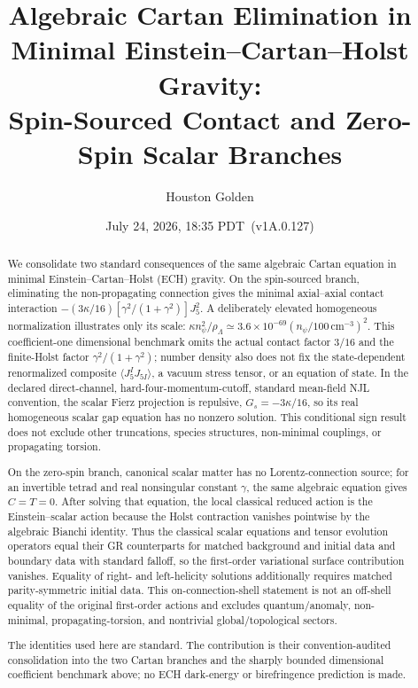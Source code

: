 \documentclass[aps,prd,twocolumn,superscriptaddress,preprintnumbers,nofootinbib,longbibliography,floatfix]{revtex4-2}
\newcommand{\paperVersion}{v1A.0.127}
\newcommand{\paperTimestamp}{July 24, 2026, 18:35 PDT}
\begin{document}

\title{Algebraic Cartan Elimination in Minimal Einstein--Cartan--Holst Gravity:\\
Spin-Sourced Contact and Zero-Spin Scalar Branches}

\author{Houston Golden}

\date{\paperTimestamp\ (\paperVersion)}

\begin{abstract}
We consolidate two standard consequences of the same algebraic Cartan
equation in minimal Einstein--Cartan--Holst (ECH) gravity.  On the
spin-sourced branch, eliminating the non-propagating connection gives the
minimal axial--axial contact interaction
$-(3\kappa/16)[\gamma^2/(1+\gamma^2)]J_5^2$.  A deliberately elevated
homogeneous normalization illustrates only its scale:
$\kappa n_\psi^2/\rho_\Lambda\simeq
3.6\times10^{-69}(n_\psi/100\,\mathrm{cm}^{-3})^2$.
This coefficient-one dimensional benchmark omits the actual contact factor
$3/16$ and the finite-Holst factor $\gamma^2/(1+\gamma^2)$; number density
also does not fix the state-dependent renormalized composite
$\langle J_5^I J_{5I}\rangle$, a vacuum stress tensor, or an equation of
state.  In the declared direct-channel, hard-four-momentum-cutoff, standard
mean-field NJL convention, the scalar Fierz projection is repulsive,
$G_s=-3\kappa/16$, so its real homogeneous scalar gap equation has no nonzero
solution.  This conditional sign result does not exclude other truncations,
species structures, non-minimal couplings, or propagating torsion.

On the zero-spin branch, canonical scalar matter has no Lorentz-connection
source; for an invertible tetrad and real nonsingular constant $\gamma$, the
same algebraic equation gives $C=T=0$.  After solving that equation, the local
classical reduced action is the Einstein--scalar action because the Holst
contraction vanishes pointwise by the algebraic Bianchi identity.  Thus the
classical scalar equations and tensor evolution operators equal their GR
counterparts for matched background and initial data and boundary data with
standard falloff, so the first-order variational surface contribution
vanishes.  Equality of right- and left-helicity solutions additionally
requires matched parity-symmetric initial data.  This on-connection-shell
statement is not an off-shell equality
of the original first-order actions and excludes quantum/anomaly,
non-minimal, propagating-torsion, and nontrivial global/topological sectors.

The identities used here are standard.  The contribution is their
convention-audited consolidation into the two Cartan branches and the sharply
bounded dimensional coefficient benchmark above; no ECH dark-energy or
birefringence prediction is made.
\end{abstract}
\end{document}
